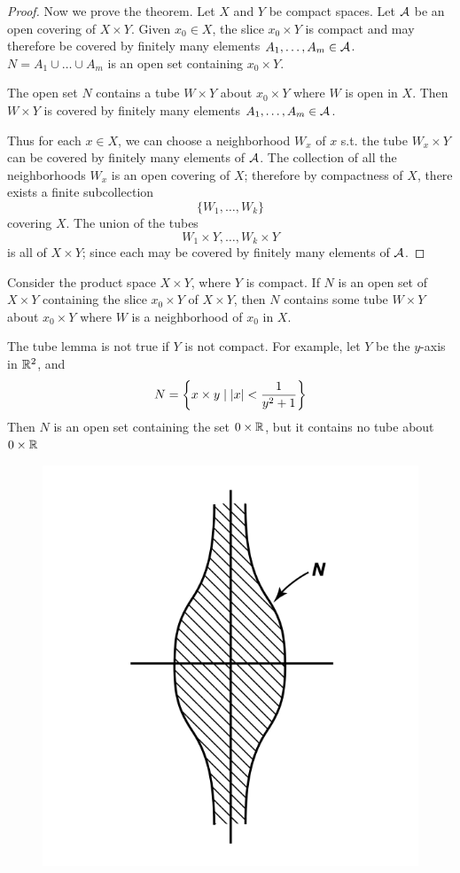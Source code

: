 \documentclass[11pt]{article}
\begin{document}
\begin{proof}
Now we prove the theorem. Let \(X\) and \(Y\) be compact spaces. Let \(\mathcal{A}\) be an open covering
of \(X\times Y\). Given \(x_0\in X\), the slice \(x_0\times Y\) is compact and may therefore be covered by
finitely many elements \(A_1,\dots,A_m\in\mathcal{A}\). \(N=A_1\cup\dots\cup A_m\) is an open set containing \(x_0\times Y\).

The open set \(N\) contains a tube \(W\times Y\) about \(x_0\times Y\) where \(W\) is open in \(X\).
Then \(W\times Y\) is covered by finitely many elements \(A_1,\dots,A_m\in\mathcal{A}\).

Thus for each \(x\in X\), we can choose a neighborhood \(W_x\) of \(x\) s.t. the tube \(W_x\times Y\) can
be covered by finitely many elements of \(\mathcal{A}\). The collection of all the neighborhoods \(W_x\) is
an open covering of \(X\); therefore by compactness of \(X\), there exists a finite subcollection
\begin{equation*}
\{W_1,\dots,W_k\}
\end{equation*}
covering \(X\). The union of the tubes
\begin{equation*}
W_1\times Y,\dots,W_k\times Y
\end{equation*}
is all of \(X\times Y\); since each may be covered by finitely many elements of \(\mathcal{A}\).
\end{proof}

\begin{lemma}
\label{lemma26.8}
Consider the product space \(X\times Y\), where \(Y\) is compact. If \(N\) is an open set
of \(X\times Y\) containing the slice \(x_0\times Y\) of \(X\times Y\), then \(N\) contains some tube \(W\times Y\)
about \(x_0\times Y\) where \(W\) is a neighborhood of \(x_0\) in \(X\).
\end{lemma}

\begin{examplle}[]
The tube lemma is not true if \(Y\) is not compact. For example, let \(Y\) be the \(y\)-axis
in \(\mathbb{R}^2\), and
\begin{equation*}
N=\left\{x\times y\mid \abs{x}<\frac{1}{y^2+1}\right\}
\end{equation*}
Then \(N\) is an open set containing the set \(0\times \mathbb{R}\), but it contains no tube about \(0\times\mathbb{R}\)
\begin{figure}[htbp]
\centering
\includegraphics[width=.4\textwidth]{../images/Topology/7.png}
\label{}
\end{figure}
\end{examplle}
\end{document}
